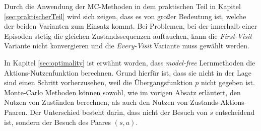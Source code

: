 \par 
 Durch die Anwendung der MC-Methoden in dem praktischen Teil in Kapitel \ref{sec:praktischerTeil} wird sich zeigen, dass es von großer Bedeutung ist, welche der beiden Varianten zum Einsatz kommt. Bei Problemen, bei der innerhalb einer Episoden stetig die gleichen Zustandssequenzen auftauchen, kann die \textit{First-Visit} Variante nicht konvergieren und die \textit{Every-Visit} Variante muss gewählt werden.
\par 
In Kapitel \ref{sec:optimality} ist erwähnt worden, dass \textit{model-free} Lernmethoden die Aktions-Nutzenfunktion berechnen. Grund hierfür ist, dass sie nicht in der Lage sind einen Schritt vorherzusehen, weil die Übergangsfunktion $p$ nicht gegeben ist. Monte-Carlo Methoden können sowohl, wie im vorigen Absatz erläutert, den Nutzen von Zuständen berechnen, als auch den Nutzen von Zustands-Aktions-Paaren. Der Unterschied besteht darin, dass nicht der Besuch von $s$ entscheidend ist, sondern der Besuch des Paares $(s,a)$.

